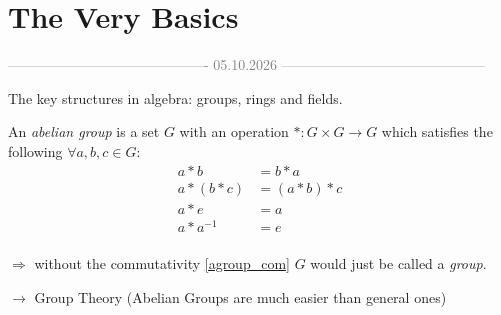 \setcounter{section}{-1}
\section{The Very Basics} 

\begin{center}
\textcolor{gray}{------------------------------------------- 05.10.2026 --------------------------------------------} \\[0.3em]
\end{center}

The key structures in algebra: groups, rings and fields.

\begin{definition}[title =  Definition (Abelian) Group]
    An \textit{abelian group} is a set $G$ with an operation $\ast: G \times G \to G$ which satisfies the following $\forall a, b, c \in G$: 
    \begin{align*}
  a \ast b &= b \ast a \tag{C}\label{agroup_com}\\
  a \ast (b \ast c) &= (a\ast b) \ast c \tag{A}\label{agroup_asso} \\
  a \ast e & = a \tag{N}\label{agroup_neutral} \\
  a \ast a^{-1} &= e \tag{I}\label{agroup_inverse}
\end{align*} \ \\[0.3em]
$\Rightarrow$ without the commutativity \eqref{agroup_com} $G$ would just be called a \textit{group}.
\end{definition}
$\rightarrow$ Group Theory (Abelian Groups are much easier than general ones) 

